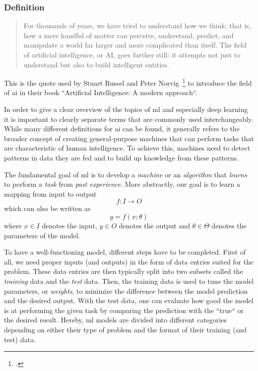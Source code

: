 \subsubsection{Definition}
\label{sub:definition}

\begin{quote}
For thousands of years, we have tried to understand how we think; that is, how a mere handful of matter can perceive, understand, predict, and manipulate a world far larger and more complicated than itself. The field of artificial intelligence, or AI, goes further still: it attempts not just to understand but also to build intelligent entities.
\end{quote}

This is the quote used by Stuart Russel and Peter Norvig~\footcite{russell2016artificial} to introduce the field of \gls{ai} in their book “Artificial Intelligence: A modern approach“.

In order to give a clear overview of the topics of \gls{ml} and especially deep learning it is important to clearly separate terms that are commonly used interchangeably. While many different definitions for \gls{ai} can be found, it generally refers to the broader concept of creating general-purpose machines that can perform tasks that are characteristic of human intelligence. To achieve this, machines need to detect patterns in data they are fed and to build up knowledge from these patterns.

The fundamental goal of \gls{ml} is to develop a \textit{machine} or an \textit{algorithm} that \textit{learns} to perform a \textit{task} from \textit{past experience}. More abstractly, our goal is to learn a mapping from input to output
\begin{equation}
	f : I \rightarrow O
\end{equation}
which can also be written as
\begin{equation}
	y = f(x ; \theta)
\end{equation}
where $ x \in I $ denotes the input, $ y \in O $ denotes the output and $ \theta \in \Theta $ denotes the parameters of the model.

To have a well-functioning model, different steps have to be completed. First of all, we need proper inputs (and outputs) in the form of data entries suited for the problem. These data entries are then typically split into two subsets called the \textit{training} data and the \textit{test} data. Then, the training data is used to tune the model parameters, or \textit{weights}, to minimize the difference between the model prediction and the desired output. With the test data, one can evaluate how good the model is at performing the given task by comparing the prediction with the “true“ or the desired result. Hereby, \gls{ml} models are divided into different categories depending on either their type of problem and the format of their training (and test) data.

